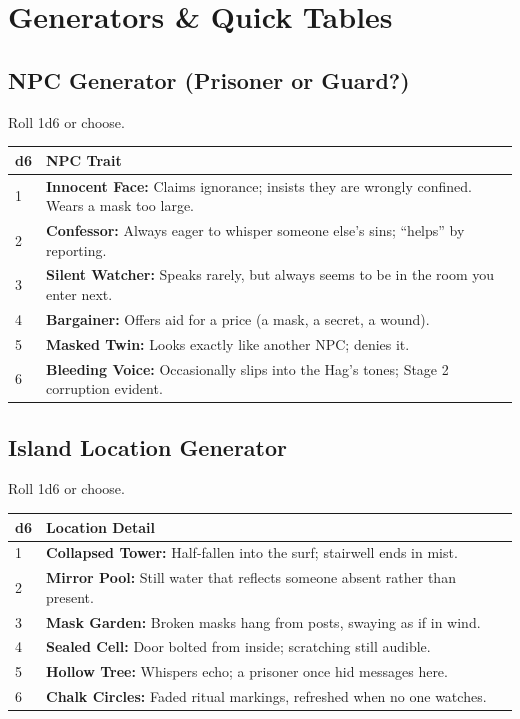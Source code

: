 \documentclass[11pt]{article}
\begin{document}
\appendix

\section{Generators \& Quick Tables}

\subsection{NPC Generator (Prisoner or Guard?)}
Roll 1d6 or choose.
\begin{longtable}{@{}p{1cm}p{14cm}@{}}
\toprule
\textbf{d6} & \textbf{NPC Trait} \\
\midrule
1 & \textbf{Innocent Face:} Claims ignorance; insists they are wrongly confined. Wears a mask too large. \\
2 & \textbf{Confessor:} Always eager to whisper someone else's sins; ``helps'' by reporting. \\
3 & \textbf{Silent Watcher:} Speaks rarely, but always seems to be in the room you enter next. \\
4 & \textbf{Bargainer:} Offers aid for a price (a mask, a secret, a wound). \\
5 & \textbf{Masked Twin:} Looks exactly like another NPC; denies it. \\
6 & \textbf{Bleeding Voice:} Occasionally slips into the Hag's tones; Stage 2 corruption evident. \\
\bottomrule
\end{longtable}

\subsection{Island Location Generator}
Roll 1d6 or choose.
\begin{longtable}{@{}p{1cm}p{14cm}@{}}
\toprule
\textbf{d6} & \textbf{Location Detail} \\
\midrule
1 & \textbf{Collapsed Tower:} Half-fallen into the surf; stairwell ends in mist. \\
2 & \textbf{Mirror Pool:} Still water that reflects someone absent rather than present. \\
3 & \textbf{Mask Garden:} Broken masks hang from posts, swaying as if in wind. \\
4 & \textbf{Sealed Cell:} Door bolted from inside; scratching still audible. \\
5 & \textbf{Hollow Tree:} Whispers echo; a prisoner once hid messages here. \\
6 & \textbf{Chalk Circles:} Faded ritual markings, refreshed when no one watches. \\
\bottomrule
\end{longtable}
\end{document}
